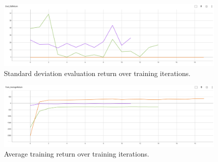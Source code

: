 \documentclass{article}
\begin{document}
\begin{answer}[title=Plot,height=9.5cm,width=\linewidth]
    \begin{figure}[H]
        \centering
        \includegraphics[width=.99\linewidth]{figs/P3_2.png}
        \caption{Standard deviation evaluation return over training iterations.
            \color{orange}{Orange: cheetah.}
            \color{violet}{Purple: obstacles.}
            \color{green}{Green: reacher.}}
    \end{figure}
\end{answer}

\begin{answer}[title=Plot,height=9.5cm,width=\linewidth]
    \begin{figure}[H]
        \centering
        \includegraphics[width=.99\linewidth]{figs/P3_3.png}
        \caption{Average training return over training iterations.
            \color{orange}{Orange: cheetah.}
            \color{violet}{Purple: obstacles.}
            \color{green}{Green: reacher.}}
    \end{figure}
\end{answer}
\end{document}

